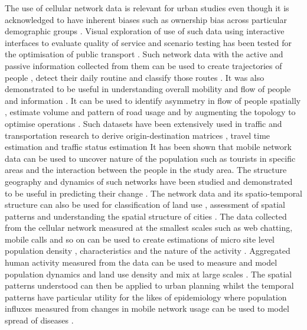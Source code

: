 The use of cellular network data is relevant for urban studies \citep{jiang2013,steenbruggen2015, lokanathan2015, calabrese2015, reades2007} even though it is acknowledged to have inherent biases such as ownership bias across particular demographic groups \citep{wesolowski2013}.
Visual exploration of use of such data using interactive interfaces to evaluate quality of service and scenario testing has been tested for the optimisation of public transport \cite{sbodio2014}.
Such network data with the active and passive information collected from them can be used to create trajectories of people \citep{schlaich2010}, detect their daily routine \citep{sevtsuk2010} and classify those routes \citep{becker2011a}.
It was also demonstrated to be useful in understanding overall mobility and flow of people and information \citep{candia2008, krings2009, simini2012, zhang2019}.
It can be used to identify asymmetry in flow of people spatially \citep{phithakkitnukoon2011}, estimate volume and pattern of road usage \citep{bolla2000, wang2012} and by augmenting the topology to optimise operations \citep{puzis2013}.
Such datasets have been extensively used in traffic and transportation research to derive origin-destination matrices \citep{caceres2007, mellegard2011, iqbal2014}, travel time estimation \citep{janecek2012} and traffic status estimation \citep{demissie2013, grauwin2015}        
It has been shown that mobile network data can be used to uncover nature of the population such as tourists in specific areas \citep{girardin2008} and the interaction between the people in the study area.
The structure \citep{onnela2007, onnela2007a} geography \citep{lambiotte2008} and dynamics \citep{hidalgo2008} of such networks have been studied and demonstrated to be useful in predicting their change \citep{wang2011}.
The network data and its spatio-temporal structure can also be used for classification of land use \citep{pei2014}, assessment of spatial patterns \citep{reades2009, steenbruggen2013} and understanding the spatial structure of cities \citep{louail2014, arribas-bel2015}.
The data collected from the cellular network measured at the smallest scales such as web chatting, mobile calls and so on can be used to create estimations of micro site level population density \citep{pulselli2008}, characteristics \citep{girardin2009} and the nature of the activity \citep{phithakkitnukoon2010}.
Aggregated human activity measured from the data can be used to measure and model population dynamics and land use density and mix at large scales \citep{jacobs-crisioni2014, tranos2015, tranos2018}.
The spatial patterns understood can then be applied to urban planning \citep{becker2011b} whilst the temporal patterns have particular utility for the likes of epidemiology where population influxes measured from changes in mobile network usage can be used to model spread of diseases \citep{buckee2015}.

